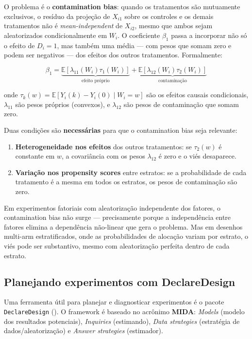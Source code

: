 \documentclass[
]{article}
\begin{document}
O problema é o \textbf{contamination bias}: quando os tratamentos são mutuamente exclusivos, o resíduo da projeção de \(X_{i1}\) sobre os controles e os demais tratamentos não é \emph{mean-independent} de \(X_{i2}\), mesmo que ambos sejam aleatorizados condicionalmente em \(W_i\). O coeficiente \(\beta_1\) passa a incorporar não só o efeito de \(D_i = 1\), mas também uma média --- com pesos que somam zero e podem ser negativos --- dos efeitos dos outros tratamentos. Formalmente:

\[\beta_1 = \underbrace{\mathbb{E}[\lambda_{11}(W_i)\tau_1(W_i)]}_{\text{efeito próprio}} + \underbrace{\mathbb{E}[\lambda_{12}(W_i)\tau_2(W_i)]}_{\text{contaminação}}\]

onde \(\tau_k(w) = \mathbb{E}[Y_i(k) - Y_i(0) \mid W_i = w]\) são os efeitos causais condicionais, \(\lambda_{11}\) são pesos próprios (convexos), e \(\lambda_{12}\) são pesos de contaminação que somam zero.

Duas condições são \textbf{necessárias} para que o contamination bias seja relevante:

\begin{enumerate}
\def\labelenumi{\arabic{enumi}.}
\item
  \textbf{Heterogeneidade nos efeitos} dos outros tratamentos: se \(\tau_2(w)\) é constante em \(w\), a covariância com os pesos \(\lambda_{12}\) é zero e o viés desaparece.
\item
  \textbf{Variação nos propensity scores} entre estratos: se a probabilidade de cada tratamento é a mesma em todos os estratos, os pesos de contaminação são zero.
\end{enumerate}

Em experimentos fatoriais com aleatorização independente dos fatores, o contamination bias não surge --- precisamente porque a independência entre fatores elimina a dependência não-linear que gera o problema. Mas em desenhos multi-arm estratificados, onde as probabilidades de alocação variam por estrato, o viés pode ser substantivo, mesmo com aleatorização perfeita dentro de cada estrato.

\subsection{Planejando experimentos com DeclareDesign}\label{planejando-experimentos-com-declaredesign}

Uma ferramenta útil para planejar e diagnosticar experimentos é o pacote \texttt{DeclareDesign} (). O framework é baseado no acrônimo \textbf{MIDA}: \emph{Models} (modelo dos resultados potenciais), \emph{Inquiries} (estimando), \emph{Data strategies} (estratégia de dados/aleatorização) e \emph{Answer strategies} (estimador).
\end{document}
